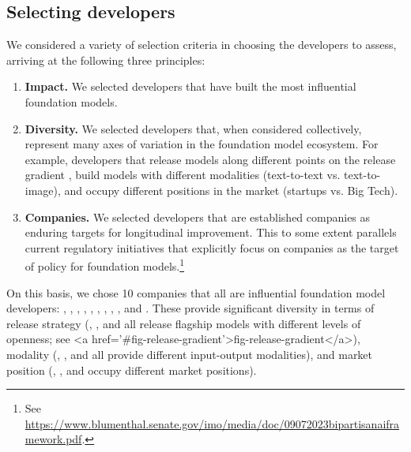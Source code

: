 \hypertarget{developer-selection}{\subsection{Selecting developers}}
\label{sec:developer-selection}
We considered a variety of selection criteria in choosing the \numcompanies developers to assess, arriving at the following three principles:
\begin{enumerate}
\item \textbf{Impact.} We selected developers that have built the most influential foundation models.
\item \textbf{Diversity.} We selected developers that, when considered collectively, represent many axes of variation in the foundation model ecosystem. For example, developers that release models along different points on the release gradient \cite[\eg open vs. closed,][]{solaiman2023gradient}, build models with different modalities (\eg text-to-text vs. text-to-image), and occupy different positions in the market (\eg startups vs. Big Tech). 
\item \textbf{Companies.} 
We selected developers that are established companies as enduring targets for longitudinal improvement. 
This to some extent parallels current regulatory initiatives that explicitly focus on companies as the target of policy for foundation models.\footnote{See \url{https://www.blumenthal.senate.gov/imo/media/doc/09072023bipartisanaiframework.pdf}.} 
\end{enumerate}
On this basis, we chose 10 companies that all are influential foundation model developers: 
\aitwentyone, \amazon, \anthropic, \cohere, \google, \huggingface, \inflection, \meta, \openai, and \stability.
These \numcompanies provide significant diversity in terms of release strategy (\eg \anthropic, \meta, and \huggingface all release flagship models with different levels of openness; see <a href='#fig-release-gradient'>fig-release-gradient</a>), modality (\eg \cohere, \openai, and \stability all provide different input-output modalities), and market position (\eg \google, \inflection, and \openai occupy different market positions).

